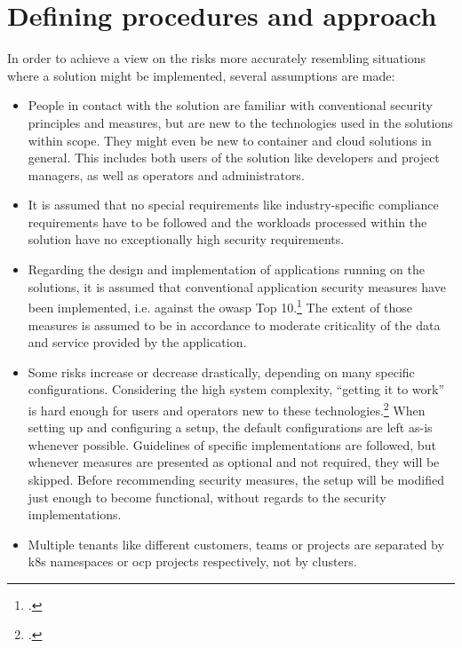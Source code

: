 \section{Defining procedures and approach}
In order to achieve a view on the risks more accurately resembling situations where a solution might be implemented, several assumptions are made:

\begin{itemize}

\item People in contact with the solution are familiar with conventional security principles and measures, but are new to the technologies used in the solutions within scope. They might even be new to container and cloud solutions in general. This includes both users of the solution like developers and project managers, as well as operators and administrators.

\item It is assumed that no special requirements like industry-specific compliance requirements have to be followed and the workloads processed within the solution have no exceptionally high security requirements. 

\item Regarding the design and implementation of applications running on the solutions, it is assumed that conventional application security measures have been implemented, i.e. against the \gls{owasp} Top 10.\footcite{topten} The extent of those measures is assumed to be in accordance to moderate criticality of the data and service provided by the application.

\item Some risks increase or decrease drastically, depending on many specific configurations. Considering the high system complexity, ``getting it to work'' is hard enough for users and operators new to these technologies.\footcite{hackAndHarden} When setting up and configuring a setup, the default configurations are left as-is whenever possible. Guidelines of specific implementations are followed, but whenever measures are presented as optional and not required, they will be skipped. Before recommending security measures, the setup will be modified just enough to become functional, without regards to the security implementations.

\item Multiple tenants like different customers, teams or projects are separated by \gls{k8s} namespaces or \gls{ocp} projects respectively, not by clusters.

\end{itemize}


